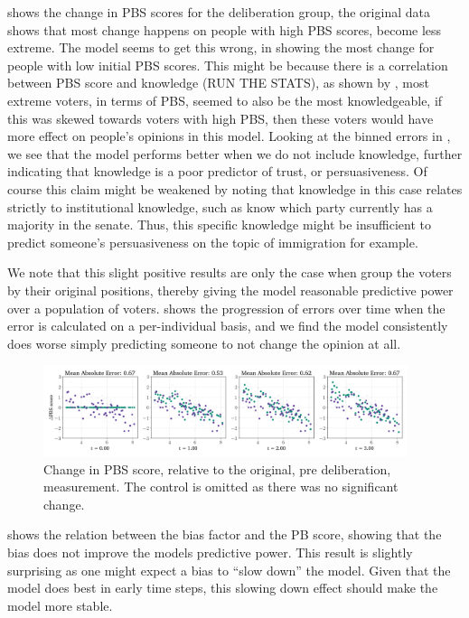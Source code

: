  shows the change in PBS scores for the deliberation group,
the original data shows that most change happens on people with high PBS
scores, become less extreme. The model seems to get this wrong, in showing the
most change for people with low initial PBS scores. This might be because there
is a correlation between PBS score and knowledge (RUN THE STATS), as shown by
\citet{fishkinCanDeliberationHave2024}, most extreme voters, in terms of PBS,
seemed to also be the most knowledgeable, if this was skewed towards voters
with high PBS, then these voters would have more effect on people's opinions in
this model. Looking at the binned errors in , we see
that the model performs better when we do not include knowledge, further
indicating that knowledge is a poor predictor of trust, or persuasiveness. Of
course this claim might be weakened by noting that knowledge in this case
relates strictly to institutional knowledge, such as know which party currently
has a majority in the senate. Thus, this specific knowledge might be
insufficient to predict someone's persuasiveness on the topic of immigration for
example.

We note that this slight positive results are only the case when group the
voters by their original positions, thereby giving the model reasonable
predictive power over a population of voters.  shows
the progression of errors over time when the error is calculated on a
per-individual basis, and we find the model consistently does worse simply predicting someone to not change the opinion at all.

\begin{figure}
	\begin{center}
		\includegraphics[width=0.95\textwidth]{Figures/change_pbs_scores.png}
	\end{center}
	\caption{Change in PBS score, relative to the original, pre deliberation, measurement. The control is  omitted as there was no significant change.}\label{fig:delta_pbs}
\end{figure}

 shows the relation between the bias factor and the PB
score, showing that the bias does not improve the models predictive power. This
result is slightly surprising as one might expect a bias to ``slow down'' the
model. Given that the model does best in early time steps, this slowing down
effect should make the model more stable.


